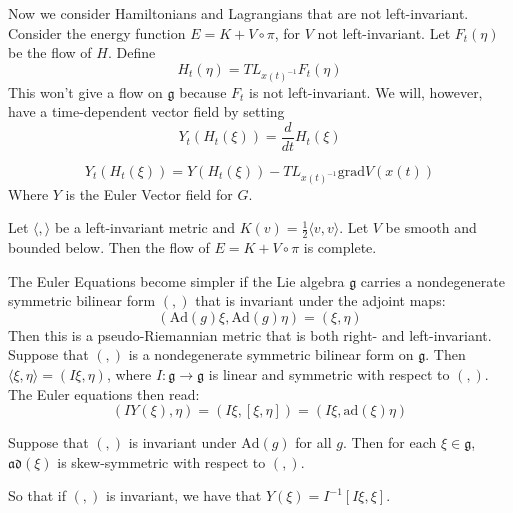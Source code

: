Now we consider Hamiltonians and Lagrangians that are not left-invariant. Consider the energy function $E=K+V \circ \pi$, for $V$ not left-invariant. Let $F_t(\eta)$ be the flow of $H$. Define 
\begin{equation}H_t(\eta) = TL_{x(t)^{-1}} F_t(\eta)\end{equation}
This won't give a flow on $\mathfrak{g}$ because $F_t$ is not left-invariant. We will, however, have a time-dependent vector field by setting
\begin{equation}Y_t(H_t(\xi)) = \frac{d}{dt}H_t(\xi)\end{equation}

\begin{prop}
\begin{equation}Y_t(H_t(\xi)) = Y(H_t(\xi))-TL_{x(t)^{-1}} \mathrm{grad} V(x(t))\end{equation}
Where $Y$ is the Euler Vector field for $G$.
\end{prop}

\begin{prop}
Let $\langle, \rangle$ be a left-invariant metric and $K(v)=\frac{1}{2}\langle v, v \rangle$. Let $V$ be smooth and bounded below. Then the flow of $E=K+V \circ \pi$ is complete.
\end{prop}

The Euler Equations become simpler if the Lie algebra $\mathfrak{g}$ carries a nondegenerate symmetric bilinear form $(,)$ that is invariant under the adjoint maps:
\begin{equation}(\mathrm{Ad}(g) \xi, \mathrm{Ad}(g) \eta) = (\xi, \eta)\end{equation}
Then this is a pseudo-Riemannian metric that is both right- and left-invariant. \\
\indent Suppose that $(,)$ is a nondegenerate symmetric bilinear form on $\mathfrak{g}$. Then $\langle \xi, \eta \rangle = (I\xi,\eta)$, where $I:\mathfrak{g} \to \mathfrak{g}$ is linear and symmetric with respect to $(,)$. The Euler equations then read:
\begin{equation}(IY(\xi),\eta)=(I\xi, [\xi,\eta])=(I\xi, \mathrm{ad}(\xi)\eta)\end{equation}

\begin{lem}
Suppose that $(,)$ is invariant under $\mathrm{Ad}(g)$ for all $g$. Then for each $\xi \in \mathfrak{g}$, $\mathfrak{ad}(\xi)$ is skew-symmetric with respect to $(,)$.
\end{lem}
So that if $(,)$ is invariant, we have that $Y(\xi) = I^{-1}[I\xi,\xi]$.

